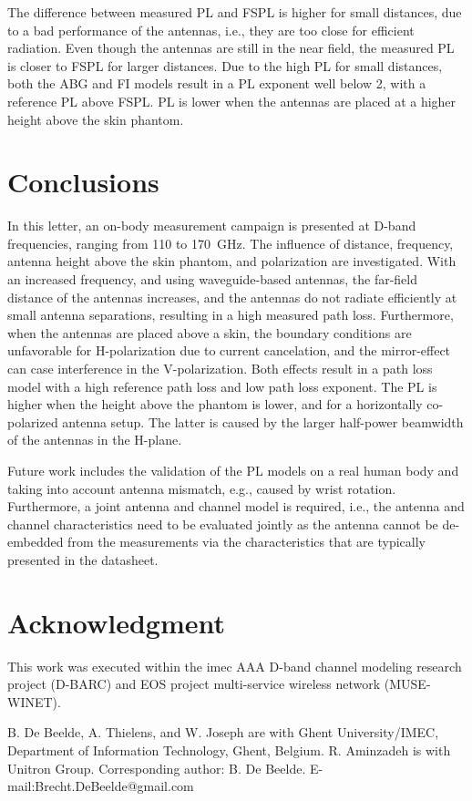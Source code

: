 \documentclass[preprint]{rsl}
\begin{document}
The difference between measured PL and FSPL is higher for small distances, due to a bad performance of the antennas, i.e., they are too close for efficient radiation. 
Even though the antennas are still in the near field, the measured PL is closer to FSPL for larger distances. 
Due to the high PL for small distances, both the ABG and FI models result in a PL exponent well below 2, with a reference PL above FSPL. 
PL is lower when the antennas are placed at a higher height above the skin phantom. 

\section{Conclusions\label{sect:conclusion}}

In this letter, an on-body measurement campaign is presented at D-band frequencies, ranging from 110 to 170~GHz. 
The influence of distance, frequency, antenna height above the skin phantom, and polarization are investigated.
With an increased frequency, and using waveguide-based antennas, the far-field distance of the antennas increases, and the antennas do not radiate efficiently at small antenna separations, resulting in a high measured path loss. 
Furthermore, when the antennas are placed above a skin, the boundary conditions are unfavorable for H-polarization due to current cancelation, and the mirror-effect can case interference in the V-polarization.
Both effects result in a path loss model with a high reference path loss and low path loss exponent.
The PL is higher when the height above the phantom is lower, and for a horizontally co-polarized antenna setup. 
The latter is caused by the larger half-power beamwidth of the antennas in the H-plane.

Future work includes the validation of the PL models on a real human body and taking into account antenna mismatch, e.g., caused by wrist rotation.
Furthermore, a joint antenna and channel model is required, i.e., the antenna and channel characteristics need to be evaluated jointly as the antenna cannot be de-embedded from the measurements via the characteristics that are typically presented in the datasheet.

\section{Acknowledgment}

This work was executed within the imec AAA D-band channel modeling research project (D-BARC) and EOS project multi-service wireless network (MUSE-WINET). 

\vspace{3pt}

\suppressfloats


\suppressfloats

\vspace{7pt}

%
%
\noindent\small
B. De Beelde, A. Thielens, and W. Joseph are with Ghent University/IMEC, Department of Information Technology, Ghent, Belgium. 
R. Aminzadeh is with Unitron Group. 
Corresponding author: B. De Beelde. 
E-mail:Brecht.DeBeelde@gmail.com
\end{document}
